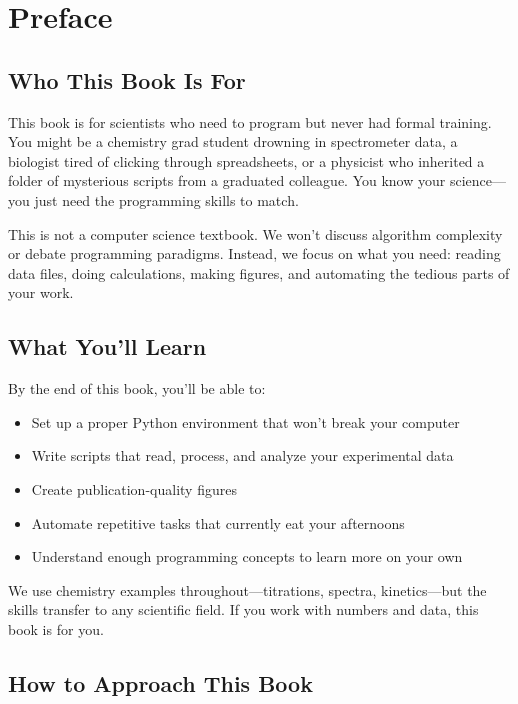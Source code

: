
\chapter*{Preface}

\section*{Who This Book Is For}

This book is for scientists who need to program but never had formal training. You might be a chemistry grad student drowning in spectrometer data, a biologist tired of clicking through spreadsheets, or a physicist who inherited a folder of mysterious scripts from a graduated colleague. You know your science---you just need the programming skills to match.

This is not a computer science textbook. We won't discuss algorithm complexity or debate programming paradigms. Instead, we focus on what you need: reading data files, doing calculations, making figures, and automating the tedious parts of your work.

\section*{What You'll Learn}

By the end of this book, you'll be able to:

\begin{itemize}
    \item Set up a proper Python environment that won't break your computer
    \item Write scripts that read, process, and analyze your experimental data
    \item Create publication-quality figures
    \item Automate repetitive tasks that currently eat your afternoons
    \item Understand enough programming concepts to learn more on your own
\end{itemize}

We use chemistry examples throughout---titrations, spectra, kinetics---but the skills transfer to any scientific field. If you work with numbers and data, this book is for you.

\section*{How to Approach This Book}

